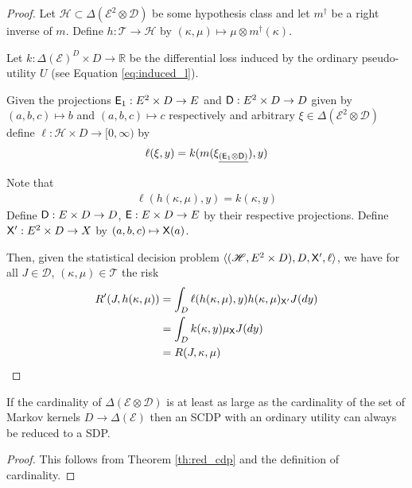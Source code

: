 \begin{proof}
Let $\mathscr{H}\subset \Delta(\mathcal{E}^2\otimes \mathcal{D})$ be some hypothesis class and let $m^\dagger$ be a right inverse of $m$. Define $h:\mathscr{T}\to \mathscr{H}$ by $(\kappa,\mu)\mapsto \mu \otimes m^{\dagger}(\kappa)$.

Let $k:\Delta(\mathcal{E})^D\times D\to \mathbb{R}$ be the differential loss induced by the ordinary pseudo-utility $U$ (see Equation \ref{eq:induced_l}).

Given the projections $\mathsf{E}_1:E^2\times D\to E$ and $\mathsf{D}:E^2\times D\to D$ given by $(a,b,c)\mapsto b$ and $(a,b,c)\mapsto c$ respectively and arbitrary $\xi\in\Delta(\mathcal{E}^2\otimes\mathcal{D})$ define $\ell:\mathscr{H}\times D\to [0,\infty)$ by
\begin{align}
    \ell(\xi,y) = k(m(\xi_{\underline{(\mathsf{E}_1\otimes\mathsf{D})}}),y)
\end{align}

Note that
\begin{align}
    \ell(h(\kappa,\mu),y) = k(\kappa,y)
\end{align}
Define $\mathsf{D}:E\times D\to D$, $\mathsf{E}:E\times D\to E$ by their respective projections. Define $\mathsf{X}':E^2\times D\to X$ by $(a,b,c)\mapsto \mathsf{X}(a)$.

Then, given the statistical decision problem $\langle(\mathscr{H},E^2\times D),D,\mathsf{X}',\ell\rangle$, we have for all $J\in \mathscr{D}$, $(\kappa,\mu)\in\mathscr{T}$ the risk
\begin{align}
    R'(J,h(\kappa,\mu)) &= \int_D \ell (h(\kappa,\mu),y)  h(\kappa,\mu)_{\mathsf{X}'} J(dy) \\
                        &= \int_D k(\kappa,y) \mu_{\mathsf{X}} J(dy)\\
                        &= R(J,\kappa,\mu)
\end{align}
\end{proof}

\begin{corollary}\label{cor:card_reduc}
If the cardinality of $\Delta(\mathcal{E}\otimes\mathcal{D})$ is at least as large as the cardinality of the set of Markov kernels $D\to \Delta(\mathcal{E})$ then an SCDP with an ordinary utility can always be reduced to a SDP.
\end{corollary}

\begin{proof}
This follows from Theorem \ref{th:red_cdp} and the definition of cardinality.
\end{proof}

